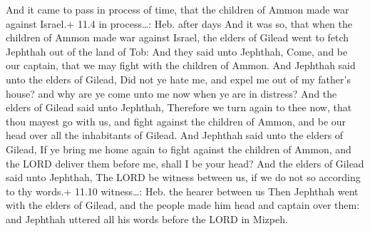  And it came to pass in process of time, that the children
of Ammon made war against Israel.+ 11.4 in process\ldots: Heb. after
days  And it was so, that when the children of Ammon made
war against Israel, the elders of Gilead went to fetch Jephthah out of
the land of Tob:  And they said unto Jephthah, Come, and be
our captain, that we may fight with the children of Ammon. 
And Jephthah said unto the elders of Gilead, Did not ye hate me, and
expel me out of my father's house? and why are ye come unto me now when
ye are in distress?  And the elders of Gilead said unto
Jephthah, Therefore we turn again to thee now, that thou mayest go with
us, and fight against the children of Ammon, and be our head over all
the inhabitants of Gilead.  And Jephthah said unto the
elders of Gilead, If ye bring me home again to fight against the
children of Ammon, and the LORD deliver them before me, shall I be your
head?  And the elders of Gilead said unto Jephthah, The
LORD be witness between us, if we do not so according to thy words.+
11.10 witness\ldots: Heb. the hearer between us  Then
Jephthah went with the elders of Gilead, and the people made him head
and captain over them: and Jephthah uttered all his words before the
LORD in Mizpeh.

